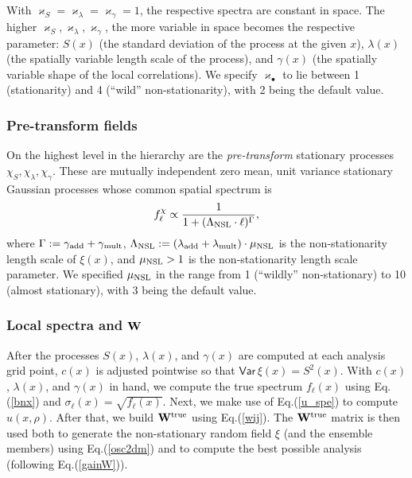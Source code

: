 \documentclass[12pt]{article}
\newcommand{\Var}{{\mathsf{Var}}\,}
\begin{document}
With $\varkappa_S= \varkappa_\lambda= \varkappa_\gamma=1$, 
the respective spectra are constant in space.
The higher $\varkappa_S, \varkappa_\lambda, \varkappa_\gamma$,
 the more variable in space becomes the respective parameter:
$S(x)$ (the standard deviation of the process at the given $x$),
$\lambda(x)$ (the spatially variable length scale of the process), and
$\gamma(x)$ (the spatially variable shape of the local correlations).
We specify $\varkappa_\bullet$ to lie between 1 (stationarity) and 4 (``wild'' non-stationarity),
with 2 being the default value.



\subsubsection {Pre-transform fields}
\label{sec_pre}





On the highest level in the hierarchy are the {\em pre-transform} stationary  processes 
$\chi_S,\chi_\lambda,\chi_\gamma$.
These are mutually independent zero mean, unit variance stationary Gaussian processes  
whose common spatial spectrum is 
%
\begin {equation}
\label{b_chi}
f_\ell^\chi \propto \frac{1} {1 + (\Lambda_{\rm NSL} \cdot\ell)^\Gamma},
\end {equation}
%
where $\Gamma :=\gamma_{\rm add} + \gamma_{\rm mult}$,
$\Lambda_{\rm NSL} :=(\lambda_{\rm add} + {\lambda}_{\rm mult}) \cdot  \mu_{\rm NSL}$
is the non-stationarity length scale of $\xi(x)$, and
$\mu_{\rm NSL}>1$ is the 
non-stationarity  length scale parameter.
We specified  $\mu_{\rm NSL}$ in the range from 1 (``wildly'' non-stationary) to 10 (almost stationary), 
with 3 being the default value.

 





\subsubsection {Local spectra and \texorpdfstring{${\bf W}$}{Lg} }
\label{sec_LSM_loc_spec}





After the processes $S(x)$, $\lambda(x)$, and $\gamma(x)$ are computed at each analysis
grid point,  $c(x)$ is adjusted pointwise so that $\Var\xi(x) = S^2(x)$.
With $c(x)$, $\lambda(x)$, and $\gamma(x)$ in hand, we  compute 
the true  spectrum $f_\ell(x)$ using Eq.(\ref{bnx}) and 
$\sigma_\ell(x) = \sqrt{f_\ell(x)}$.
Next, we make use of Eq.(\ref{u_spe}) to compute $u(x, \rho)$.
After that, we build  ${\bf W}^{\rm true}$ using Eq.(\ref{wij}).
The  ${\bf W}^{\rm true}$ matrix is then used both to generate the non-stationary random field $\xi$
(and the ensemble members)
using Eq.(\ref{osc2dm}) and to compute the best possible analysis (following Eq.(\ref{gainW})).
\end{document}
